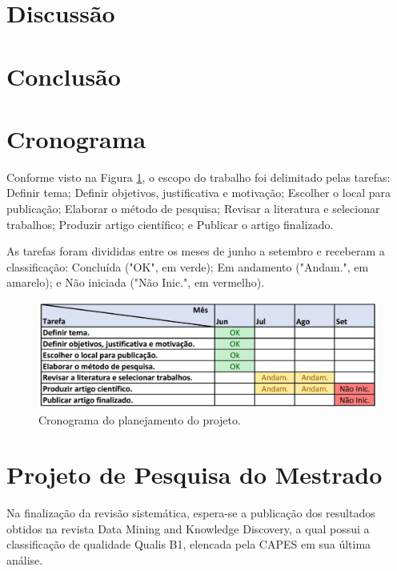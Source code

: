 \documentclass[smallextended]{svjour3}       %
\begin{document}
\section{Discussão}
\label{sec:5}

\section{Conclusão}
\label{sec:6}

\section{Cronograma}
\label{sec:7}

Conforme visto na Figura \ref{fig:cronograma}, o escopo do trabalho foi delimitado pelas tarefas: Definir tema; Definir objetivos, justificativa e motivação; Escolher o local para publicação; Elaborar o método de pesquisa; Revisar a literatura e selecionar trabalhos; Produzir artigo científico; e Publicar o artigo finalizado. 

As tarefas foram divididas entre os meses de junho a setembro e receberam a classificação: Concluída ("OK", em verde); Em andamento ("Andam.", em amarelo); e Não iniciada ("Não Inic.", em vermelho). 

\begin{figure}[!ht]
	\centering
	\includegraphics[width=1\textwidth]{imagens/cronograma2.jpg}
	\caption{Cronograma do planejamento do projeto.}
	\label{fig:cronograma}
\end{figure}
	
\section{Projeto de Pesquisa do Mestrado}
\label{sec:8}

Na finalização da revisão sistemática, espera-se a publicação dos resultados obtidos na revista Data Mining and Knowledge Discovery, a qual possui a classificação de qualidade Qualis B1, elencada pela CAPES em sua última análise. 

	
\end{document}
